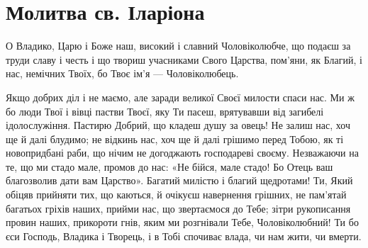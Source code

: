 \documentclass[chapters.tex]{subfiles}
\begin{document}
\section{Молитва св. Іларіона}
О Владико, Царю і Боже наш, високий і славний Чоловіколюбче, що подаєш за труди славу і честь і що твориш учасниками Свого Царства, пом’яни, як Благий, і нас, немічних Твоїх, бо Твоє ім’я — Чоловіколюбець.

Якщо добрих діл і не маємо, але заради великої Своєї милости спаси нас. Ми ж бо люди Твої і вівці пастви Твоєї, яку Ти пасеш, врятувавши від загибелі ідолослужіння. Пастирю Добрий, що кладеш душу за овець! Не залиш нас, хоч ще й далі блудимо; не відкинь нас, хоч ще й далі грішимо перед Тобою, як ті новопридбані раби, що нічим не догоджають господареві своєму. Незважаючи на те, що ми стадо мале, промов до нас: «Не бійся, мале стадо! Бо Отець ваш благозволив дати вам Царство». Багатий милістю і благий щедротами! Ти, Який обіцяв прийняти тих, що каються, й очікуєш навернення грішних, не пам’ятай багатьох гріхів наших, прийми нас, що звертаємося до Тебе; зітри рукописання провин наших, прикороти гнів, яким ми розгнівали Тебе, Чоловіколюбний! Ти бо єси Господь, Владика і Творець, і в Тобі спочиває влада, чи нам жити, чи вмерти.
\end{document}
